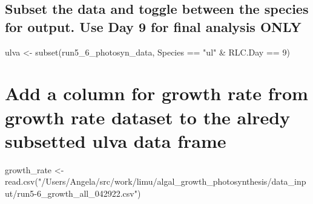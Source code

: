 \documentclass[
]{article}
\newenvironment{Shaded}{\begin{snugshade}}{\end{snugshade}}
\newcommand{\AttributeTok}[1]{\textcolor[rgb]{0.77,0.63,0.00}{#1}}
\newcommand{\DecValTok}[1]{\textcolor[rgb]{0.00,0.00,0.81}{#1}}
\newcommand{\FunctionTok}[1]{\textcolor[rgb]{0.00,0.00,0.00}{#1}}
\newcommand{\NormalTok}[1]{#1}
\newcommand{\OtherTok}[1]{\textcolor[rgb]{0.56,0.35,0.01}{#1}}
\newcommand{\SpecialCharTok}[1]{\textcolor[rgb]{0.00,0.00,0.00}{#1}}
\newcommand{\StringTok}[1]{\textcolor[rgb]{0.31,0.60,0.02}{#1}}
\begin{document}
\hypertarget{subset-the-data-and-toggle-between-the-species-for-output.-use-day-9-for-final-analysis-only}{%
\subsection{Subset the data and toggle between the species for output.
Use Day 9 for final analysis
ONLY}\label{subset-the-data-and-toggle-between-the-species-for-output.-use-day-9-for-final-analysis-only}}

\begin{Shaded}
\begin{Highlighting}[]
\NormalTok{ulva }\OtherTok{\textless{}{-}} \FunctionTok{subset}\NormalTok{(run5\_6\_photosyn\_data, Species }\SpecialCharTok{==} \StringTok{"ul"} \SpecialCharTok{\&}\NormalTok{ RLC.Day }\SpecialCharTok{==} \DecValTok{9}\NormalTok{)}
\end{Highlighting}
\end{Shaded}

\hypertarget{add-a-column-for-growth-rate-from-growth-rate-dataset-to-the-alredy-subsetted-ulva-data-frame}{%
\section{Add a column for growth rate from growth rate dataset to the
alredy subsetted ulva data
frame}\label{add-a-column-for-growth-rate-from-growth-rate-dataset-to-the-alredy-subsetted-ulva-data-frame}}

\begin{Shaded}
\begin{Highlighting}[]
\NormalTok{growth\_rate }\OtherTok{\textless{}{-}} \FunctionTok{read.csv}\NormalTok{(}\StringTok{"/Users/Angela/src/work/limu/algal\_growth\_photosynthesis/data\_input/run5{-}6\_growth\_all\_042922.csv"}\NormalTok{)}
\end{Highlighting}
\end{Shaded}

\begin{Shaded}
\end{Shaded}
\end{document}
